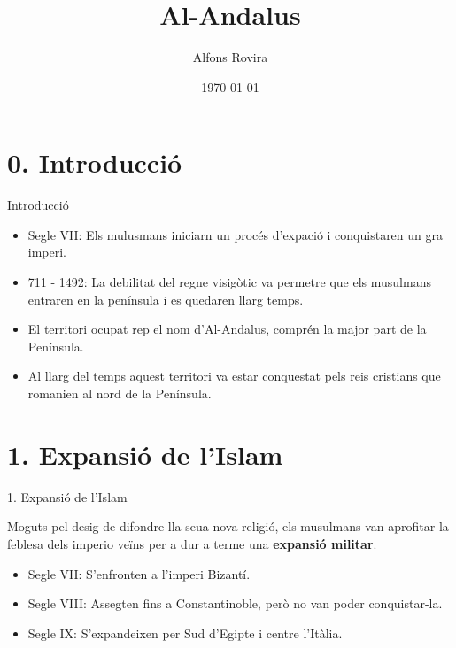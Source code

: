 \documentclass{beamer}
\title{Al-Andalus}
\date{\today}
\author{Alfons Rovira}
\institute{http://llagosti.wordpress.com}
\begin{document}
  \maketitle

  \section{0. Introducció}

  \begin{frame}{Introducció}
  
     \begin{itemize}[<+-| alert@+>]
        \item Segle VII: Els mulusmans iniciarn un procés d'expació i conquistaren un gra imperi.
        \item 711 - 1492: La debilitat del regne visigòtic va permetre que els musulmans entraren en la península i es quedaren llarg temps.
        \item El territori ocupat rep el nom d'Al-Andalus, comprén la major part de la Península.
        \item Al llarg del temps aquest territori va estar conquestat pels reis cristians que romanien al nord de la Península.
     \end{itemize}
  \end{frame}

  \section{1. Expansió de l'Islam}
  \begin{frame}{1. Expansió de l'Islam}

Moguts pel desig de difondre lla seua nova religió, els musulmans van aprofitar la feblesa dels imperio veïns per a dur a terme una \textbf{expansió militar}.
   
  \begin{itemize}
  \itemsep1pt\parskip0pt
  \item Segle VII: S'enfronten a l'imperi Bizantí.
  \item Segle VIII: Assegten fins a Constantinoble, però no van poder conquistar-la.
  \item Segle IX: S'expandeixen per Sud d'Egipte i centre l'Itàlia.

  \end{itemize}

  \end{frame}
\end{document}
